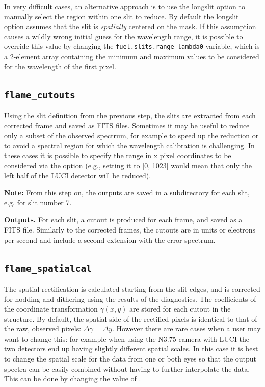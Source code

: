 \documentclass[a4paper]{article}
\begin{document}
\begin{sloppypar}
In very difficult cases, an alternative approach is to use the longslit option to manually select the region within one slit to reduce. By default the longslit option assumes that the slit is \emph{spatially} centered on the mask. If this assumption causes a wildly wrong initial guess for the wavelength range, it is possible to override this value by changing the \texttt{fuel.slits.range\_lambda0} variable, which is a 2-element array containing the minimum and maximum values to be considered for the wavelength of the first pixel.


\subsection{\texttt{flame\_cutouts}}
\label{sec:cutouts}

Using the slit definition from the previous step, the slits are extracted from each corrected frame and saved as FITS files. Sometimes it may be useful to reduce only a subset of the observed spectrum, for example to speed up the reduction or to avoid a spectral region for which the wavelength calibration is challenging. In these cases it is possible to specify the range in x pixel coordinates to be considered via the  option (e.g., setting it to [0, 1023] would mean that only the left half of the LUCI detector will be reduced).

\medskip
\noindent
\textbf{Note:} From this step on, the outputs are saved in a subdirectory for each slit, e.g.  for slit number 7.

\medskip
\noindent
\textbf{Outputs.} For each slit, a cutout is produced for each frame, and saved as a FITS file. Similarly to the corrected frames, the cutouts are in units or electrons per second and include a second extension with the error spectrum.


\subsection{\texttt{flame\_spatialcal}}
\label{sec:spatialcal}

The spatial rectification is calculated starting from the slit edges, and is corrected for nodding and dithering using the results of the diagnostics. The coefficients of the coordinate transformation $\gamma(x,y)$ are stored for each cutout in the  structure. By default, the spatial side of the rectified pixels is identical to that of the raw, observed pixels: $\Delta \gamma = \Delta y$. However there are rare cases when a user may want to change this: for example when using the N3.75 camera with LUCI the two detectors end up having slightly different spatial scales. In this case it is best to change the spatial scale for the data from one or both eyes so that the output spectra can be easily combined without having to further interpolate the data. This can be done by changing the value of .


\end{sloppypar}
\end{document}
